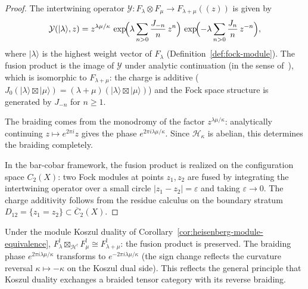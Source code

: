 \begin{proof}
The intertwining operator $\mathcal{Y}\colon F_\lambda \otimes
F_\mu \to F_{\lambda+\mu}((z))$ is given by
\[
\mathcal{Y}(|\lambda\rangle, z)
= z^{\lambda\mu/\kappa}\,
\exp\!\Bigl(\lambda \sum_{n > 0} \frac{J_{-n}}{n}\, z^n\Bigr)\,
\exp\!\Bigl(-\lambda \sum_{n > 0} \frac{J_n}{n}\, z^{-n}\Bigr),
\]
where $|\lambda\rangle$ is the highest weight vector of $F_\lambda$
(Definition~\ref{def:fock-module}).  The fusion product is the image of
$\mathcal{Y}$ under analytic continuation (in the sense
of~\cite{HLZ}), which is isomorphic to $F_{\lambda+\mu}$: the
charge is additive ($J_0(|\lambda\rangle \boxtimes |\mu\rangle)
= (\lambda + \mu)(|\lambda\rangle \boxtimes |\mu\rangle)$) and
the Fock space structure is generated by $J_{-n}$ for $n \geq 1$.

The braiding comes from the monodromy of the factor
$z^{\lambda\mu/\kappa}$: analytically continuing $z \mapsto
e^{2\pi i} z$ gives the phase $e^{2\pi i \lambda\mu/\kappa}$.
Since $\mathcal{H}_\kappa$ is abelian, this determines the braiding
completely.

In the bar-cobar framework, the fusion product is realized on the
configuration space $C_2(X)$: two Fock modules at points $z_1, z_2$
are fused by integrating the intertwining operator over a small circle
$|z_1 - z_2| = \varepsilon$ and taking $\varepsilon \to 0$.  The
charge additivity follows from the residue calculus on the boundary
stratum $D_{12} = \{z_1 = z_2\} \subset \overline{C}_2(X)$.
\end{proof}

\begin{remark}
\label{rem:fusion-koszul}
Under the module Koszul duality of
Corollary~\ref{cor:heisenberg-module-equivalence},
$F_\lambda^! \boxtimes_{\mathcal{H}^!} F_\mu^! \cong
F_{\lambda+\mu}^!$: the fusion product is preserved.  The braiding
phase $e^{2\pi i\lambda\mu/\kappa}$ transforms to
$e^{-2\pi i\lambda\mu/\kappa}$ (the sign change reflects the
curvature reversal $\kappa \mapsto -\kappa$ on the Koszul dual side).
This reflects the general principle that Koszul duality
exchanges a braided tensor category with its reverse braiding.
\end{remark}

